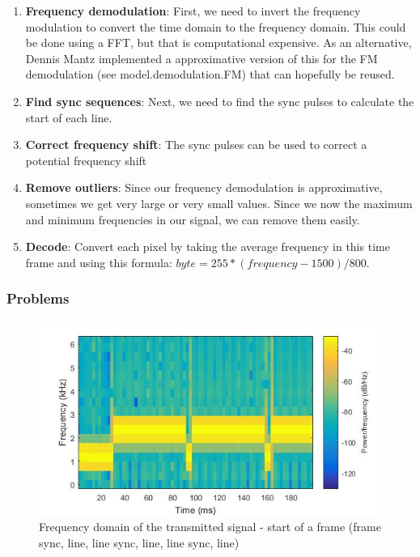 \begin{enumerate}
	\item \textbf{Frequency demodulation}: First, we need to invert the frequency modulation to convert the time domain to the frequency domain. This could be done using a \ac{FFT}, but that is computational expensive. As an alternative, Dennis Mantz implemented a approximative version of this for the FM demodulation (see model.demodulation.FM) that can hopefully be reused. 
	\item \textbf{Find sync sequences}: Next, we need to find the sync pulses to calculate the start of each line. 
	\item \textbf{Correct frequency shift}: The sync pulses can be used to correct a potential frequency shift
	\item \textbf{Remove outliers}: Since our frequency demodulation is approximative, sometimes we get very large or very small values. Since we now the maximum and minimum frequencies in our signal, we can remove them easily. 
	\item \textbf{Decode}: Convert each pixel by taking the average frequency in this time frame and using this formula: $byte = 255*(frequency-1500)/800$. 
\end{enumerate}


\subsubsection{Problems}

\begin{figure}
	\centering
	\includegraphics[width=1.0\linewidth]{gfx/sstv_nice.jpg}
	\caption{Frequency domain of the transmitted signal - start of a frame (frame sync, line, line sync, line, line sync, line)}
	\label{fig:impl:sstv:spectro_tx}
\end{figure}


